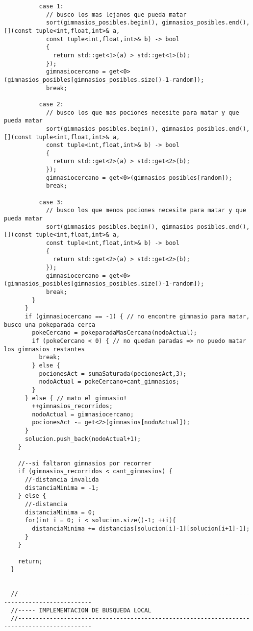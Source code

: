 \begin{lstlisting}
          case 1:
            // busco los mas lejanos que pueda matar
            sort(gimnasios_posibles.begin(), gimnasios_posibles.end(), [](const tuple<int,float,int>& a,
            const tuple<int,float,int>& b) -> bool
            {
              return std::get<1>(a) > std::get<1>(b);
            });
            gimnasiocercano = get<0>(gimnasios_posibles[gimnasios_posibles.size()-1-random]);
            break;

          case 2:
            // busco los que mas pociones necesite para matar y que pueda matar
            sort(gimnasios_posibles.begin(), gimnasios_posibles.end(), [](const tuple<int,float,int>& a,
            const tuple<int,float,int>& b) -> bool
            {
              return std::get<2>(a) > std::get<2>(b);
            });
            gimnasiocercano = get<0>(gimnasios_posibles[random]);
            break;

          case 3:
            // busco los que menos pociones necesite para matar y que pueda matar
            sort(gimnasios_posibles.begin(), gimnasios_posibles.end(), [](const tuple<int,float,int>& a,
            const tuple<int,float,int>& b) -> bool
            {
              return std::get<2>(a) > std::get<2>(b);
            });
            gimnasiocercano = get<0>(gimnasios_posibles[gimnasios_posibles.size()-1-random]);
            break;
        }
      }
      if (gimnasiocercano == -1) { // no encontre gimnasio para matar, busco una pokeparada cerca
        pokeCercano = pokeparadaMasCercana(nodoActual);
        if (pokeCercano < 0) { // no quedan paradas => no puedo matar los gimnasios restantes
          break;
        } else {
          pocionesAct = sumaSaturada(pocionesAct,3);
          nodoActual = pokeCercano+cant_gimnasios;
        }
      } else { // mato el gimnasio!
        ++gimnasios_recorridos;
        nodoActual = gimnasiocercano;
        pocionesAct -= get<2>(gimnasios[nodoActual]);
      }
      solucion.push_back(nodoActual+1);
    }

    //--si faltaron gimnasios por recorrer
    if (gimnasios_recorridos < cant_gimnasios) {
      //-distancia invalida
      distanciaMinima = -1;
    } else {
      //-distancia
      distanciaMinima = 0;
      for(int i = 0; i < solucion.size()-1; ++i){
        distanciaMinima += distancias[solucion[i]-1][solucion[i+1]-1];
      }
    }

    return;
  }


  //-------------------------------------------------------------------------------------------
  //----- IMPLEMENTACION DE BUSQUEDA LOCAL
  //-------------------------------------------------------------------------------------------


\end{lstlisting}
